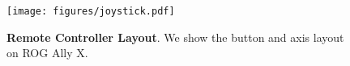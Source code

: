 \begin{figure}
  \centering
  \texttt{[image: figures/joystick.pdf]}
  \caption{\textbf{Remote Controller Layout}. We show the button and axis layout on ROG Ally X.}
  \label{fig:joystick}
\end{figure}